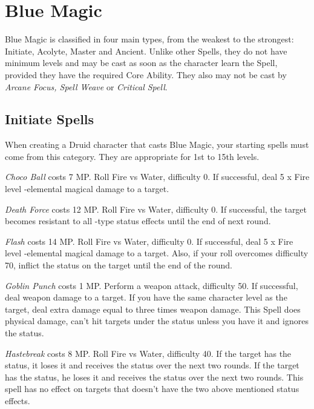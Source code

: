 \section{Blue Magic}\label{sec:magic-blue}
\begin{multicols}{2}

Blue Magic is classified in four main types, from the weakest to the strongest: Initiate, Acolyte, Master and Ancient. Unlike other Spells, they do not have minimum levels and may be cast as soon as the character learn the Spell, provided they have the required Core Ability. They also may not be cast by \textit{Arcane Focus, Spell Weave} or \textit{Critical Spell}.
 
\subsection{Initiate Spells}\label{subsec:blue-initiate}
	When creating a Druid character that casts Blue Magic, your starting spells must come from this category. They are appropriate for 1st to 15th levels.

    \textit{Choco Ball} costs 7 MP\@. Roll Fire vs Water, difficulty 0. If successful, deal 5 x Fire level -elemental magical damage to a target.

    \textit{Death Force} costs 12 MP\@. Roll Fire vs Water, difficulty 0. If successful, the target becomes resistant to all -type status effects until the end of next round.

	\textit{Flash} costs 14 MP\@. Roll Fire vs Water, difficulty 0. If successful, deal 5 x Fire level -elemental magical damage to a target. Also, if your roll overcomes difficulty 70, inflict the  status on the target until the end of the round.
	
    \textit{Goblin Punch} costs 1 MP\@. Perform a weapon attack, difficulty 50. If successful, deal weapon damage to a target. If you have the same character level as the target, deal extra damage equal to three times weapon damage. This Spell does physical damage, can’t hit targets under the  status unless you have it and ignores the  status.

    \textit{Hastebreak} costs 8 MP\@. Roll Fire vs Water, difficulty 40. If the target has the  status, it loses it and receives the  status over the next two rounds. If the target has the  status, he loses it and receives the  status over the next two rounds. This spell has no effect on targets that doesn’t have the two above mentioned status effects.
    

\end{multicols}
